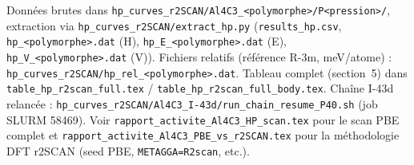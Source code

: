 \documentclass[11pt,a4paper]{article}
\begin{document}
Données brutes dans \texttt{hp\_curves\_r2SCAN/Al4C3\_<polymorphe>/P<pression>/}, extraction via
\texttt{hp\_curves\_r2SCAN/extract\_hp.py} (\texttt{results\_hp.csv},
\texttt{hp\_<polymorphe>.dat} (H), \texttt{hp\_E\_<polymorphe>.dat} (E),
\texttt{hp\_V\_<polymorphe>.dat} (V)). Fichiers relatifs (référence R-3m, meV/atome) :
\texttt{hp\_curves\_r2SCAN/hp\_rel\_<polymorphe>.dat}. Tableau complet (section~5) dans
\texttt{table\_hp\_r2scan\_full.tex} / \texttt{table\_hp\_r2scan\_full\_body.tex}. Chaîne I-43d
relancée : \texttt{hp\_curves\_r2SCAN/Al4C3\_I-43d/run\_chain\_resume\_P40.sh} (job SLURM
58469). Voir \texttt{rapport\_activite\_Al4C3\_HP\_scan.tex} pour le scan PBE complet et
\texttt{rapport\_activite\_Al4C3\_PBE\_vs\_r2SCAN.tex} pour la méthodologie DFT r2SCAN
(seed PBE, \texttt{METAGGA=R2scan}, etc.).
\end{document}
